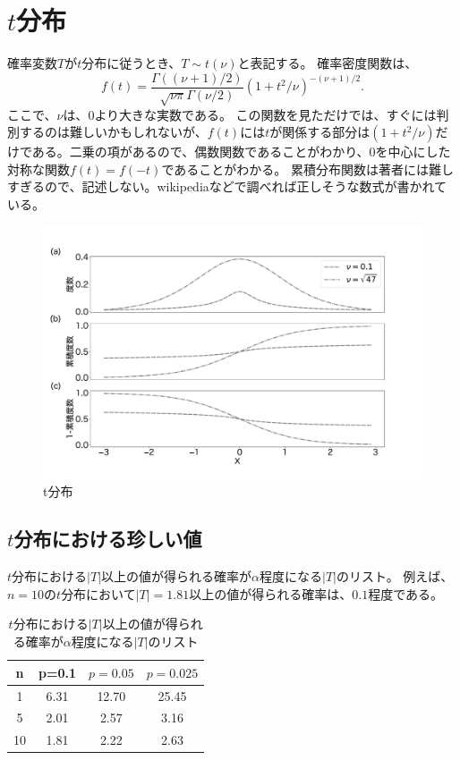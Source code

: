 \section{$t$分布}
確率変数$T$が$t$分布に従うとき、$T \sim t(\nu)$と表記する。
確率密度関数は、
\begin{equation*}
    f(t) = \frac{\Gamma((\nu+1)/2)}{\sqrt{\nu \pi}\Gamma(\nu/2) }(1+t^2/\nu)^{-(\nu+1)/2}.
\end{equation*}
ここで、$\nu$は、$0$より大きな実数である。
この関数を見ただけでは、すぐには判別するのは難しいかもしれないが、$f(t)$には$t$が関係する部分は$(1+t^2/\nu)$だけである。二乗の項があるので、偶数関数であることがわかり、$0$を中心にした対称な関数$f(t)=f(-t)$であることがわかる。
累積分布関数は著者には難しすぎるので、記述しない。wikipediaなどで調べれば正しそうな数式が書かれている。



\begin{figure}
    \begin{center}
        \includegraphics[width=15cm]{./image/02_/student_t_frequency.pdf}
        \caption{t分布}
        \label{student_t}
    \end{center}
\end{figure}

\subsection{$t$分布における珍しい値}
$t$分布における$|T|$以上の値が得られる確率が$\alpha$程度になる$|T|$のリスト。
例えば、$n=10$の$t$分布において$|T|=1.81$以上の値が得られる確率は、$0.1$程度である。


\begin{table}[hbtp]
    \caption{$t$分布における$|T|$以上の値が得られる確率が$\alpha$程度になる$|T|$のリスト}
    \label{table:student_t_confidence}
    \centering
    \begin{tabular}{cccc}
    n & p=0.1 & $p=0.05$ & $p=0.025$   \\
    \hline \hline
    1 & 6.31 & 12.70 & 25.45 \\
    5 & 2.01 &2.57  & 3.16\\
    10 & 1.81 &  2.22& 2.63 \\
      \hline
    \end{tabular}
  \end{table}


